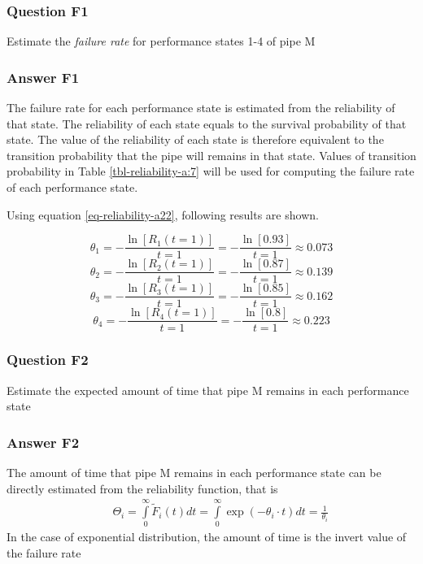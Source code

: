 \subsubsection{Question F1}

Estimate the \textit{failure rate} for performance states 1-4 of pipe M

\subsubsection{Answer F1}
%

The failure rate for each performance state is estimated from the reliability of
that state. The reliability of each state equals to the survival probability of
that state. The value of the reliability of each state is therefore equivalent to
the transition probability that the pipe will remains in that state. Values of
transition probability in Table \ref{tbl-reliability-a:7} will be used for computing the
failure rate of each performance state.

Using equation \eqref{eq-reliability-a22}, following results are shown.

\[
 {\theta _1} =  - \frac{{\ln [{R_1}(t = 1)]}}{{t = 1}} =  - \frac{{\ln
[0.93]}}{{t = 1}} \approx 0.073
\]
\[
 {\theta _2} =  - \frac{{\ln [{R_2}(t = 1)]}}{{t = 1}} =  - \frac{{\ln
[0.87]}}{{t = 1}} \approx 0.139
\]
\[
 {\theta _3} =  - \frac{{\ln [{R_3}(t = 1)]}}{{t = 1}} =  - \frac{{\ln
[0.85]}}{{t = 1}} \approx 0.162
\]
\[
 {\theta _4} =  - \frac{{\ln [{R_4}(t = 1)]}}{{t = 1}} =  - \frac{{\ln
[0.8]}}{{t = 1}} \approx 0.223
\]
\subsubsection{Question F2}
Estimate the expected amount of time that pipe M remains in each performance
state
\subsubsection{Answer F2}
The amount of time that pipe M remains in each performance state can be directly
estimated from the reliability function, that is
\begin{eqnarray}
&& {\Theta _i} = \int\limits_0^\infty  {{{\tilde F}_i}(t)dt}  =
\int\limits_0^\infty  {\exp ( - {\theta _i} \cdot t)dt}  = \frac{1}{{{\theta
_i}}}
\label{eq-reliability-a38}
\end{eqnarray}
In the case of exponential distribution, the amount of time is the invert value
of the failure rate

